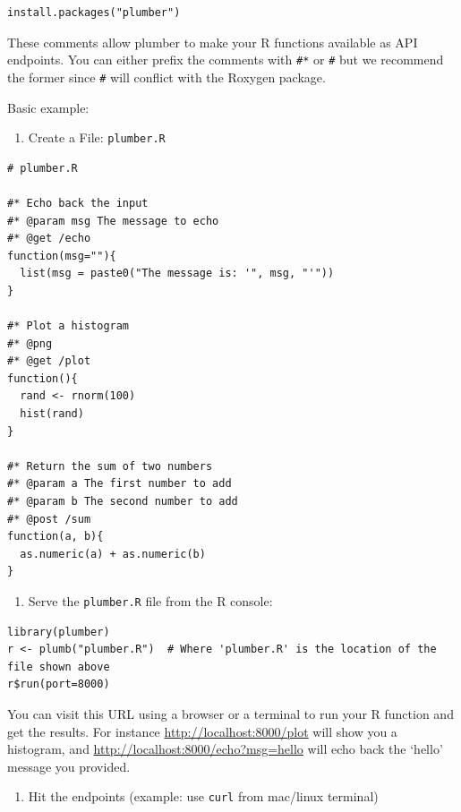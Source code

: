 \documentclass[]{book}
\providecommand{\tightlist}{%
  \setlength{\itemsep}{0pt}\setlength{\parskip}{0pt}}
\theoremstyle{definition}
\theoremstyle{definition}
\theoremstyle{definition}
\theoremstyle{remark}
\begin{document}
\begin{verbatim}
install.packages("plumber")
\end{verbatim}

These comments allow plumber to make your R functions available as API
endpoints. You can either prefix the comments with \texttt{\#*} or
\texttt{\#\textquotesingle{}} but we recommend the former since
\texttt{\#\textquotesingle{}} will conflict with the Roxygen package.

Basic example:

\begin{enumerate}
\def\labelenumi{\arabic{enumi}.}
\tightlist
\item
  Create a File: \texttt{plumber.R}
\end{enumerate}

\begin{verbatim}
# plumber.R

#* Echo back the input
#* @param msg The message to echo
#* @get /echo
function(msg=""){
  list(msg = paste0("The message is: '", msg, "'"))
}

#* Plot a histogram
#* @png
#* @get /plot
function(){
  rand <- rnorm(100)
  hist(rand)
}

#* Return the sum of two numbers
#* @param a The first number to add
#* @param b The second number to add
#* @post /sum
function(a, b){
  as.numeric(a) + as.numeric(b)
}
\end{verbatim}

\begin{enumerate}
\def\labelenumi{\arabic{enumi}.}
\setcounter{enumi}{1}
\tightlist
\item
  Serve the \texttt{plumber.R} file from the R console:
\end{enumerate}

\begin{verbatim}
library(plumber)
r <- plumb("plumber.R")  # Where 'plumber.R' is the location of the file shown above
r$run(port=8000)
\end{verbatim}

You can visit this URL using a browser or a terminal to run your R
function and get the results. For instance
\url{http://localhost:8000/plot} will show you a histogram, and
\url{http://localhost:8000/echo?msg=hello} will echo back the `hello'
message you provided.

\begin{enumerate}
\def\labelenumi{\arabic{enumi}.}
\setcounter{enumi}{2}
\tightlist
\item
  Hit the endpoints (example: use \texttt{curl} from mac/linux terminal)
\end{enumerate}
\end{document}
